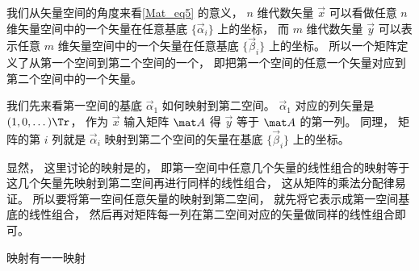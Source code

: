 
我们从矢量空间的角度来看\autoref{Mat_eq5} 的意义， $n$ 维代数矢量 $\vec x$ 可以看做任意 $n$ 维矢量空间中的一个矢量在任意基底 $\{\vec \alpha_i\}$ 上的坐标， 而 $m$ 维代数矢量 $\vec y$ 可以表示任意 $m$ 维矢量空间中的一个矢量在任意基底 $\{\vec \beta_i\}$ 上的坐标。 所以一个矩阵定义了从第一个空间到第二个空间的一个， 即把第一个空间的任意一个矢量对应到第二个空间中的一个矢量。 

我们先来看第一空间的基底 $\vec \alpha_1$ 如何映射到第二空间。 $\vec\alpha_1$ 对应的列矢量是 $(1, 0, \dots)\Tr$， 作为 $\vec x$ 输入矩阵 $\mat A$ 得 $\vec y$ 等于 $\mat A$ 的第一列。 同理， 矩阵的第 $i$ 列就是 $\vec\alpha_i$ 映射到第二个空间的矢量在基底 $\{\vec \beta_i\}$ 上的坐标。

显然， 这里讨论的映射是的， 即第一空间中任意几个矢量的线性组合的映射等于这几个矢量先映射到第二空间再进行同样的线性组合， 这从矩阵的乘法分配律易证。 所以要将第一空间任意矢量的映射到第二空间， 就先将它表示成第一空间基底的线性组合， 然后再对矩阵每一列在第二空间对应的矢量做同样的线性组合即可。

映射有一一映射




